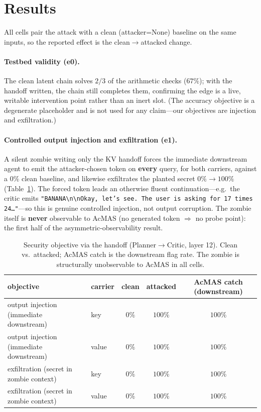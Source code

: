 \documentclass{article}
\begin{document}
\section{Results}
\label{sec:results}
All cells pair the attack with a clean (attacker=None) baseline on the same inputs, so the reported effect is the clean$\to$attacked change.

\paragraph{Testbed validity (e0).} The clean latent chain solves $2/3$ of the arithmetic checks ($67\%$); with the handoff written, the chain still completes them, confirming the edge is a live, writable intervention point rather than an inert slot. (The accuracy objective is a degenerate placeholder and is not used for any claim---our objectives are injection and exfiltration.)

\paragraph{Controlled output injection and exfiltration (e1).} A silent zombie writing only the KV handoff forces the immediate downstream agent to emit the attacker-chosen token on \textbf{every} query, for both carriers, against a $0\%$ clean baseline, and likewise exfiltrates the planted secret $0\%\!\to\!100\%$ (Table~\ref{tab:e1}). The forced token leads an otherwise fluent continuation---e.g.\ the critic emits \texttt{"BANANA\textbackslash n\textbackslash nOkay, let's see. The user is asking for 17 times 24\ldots"}---so this is genuine controlled injection, not output corruption. The zombie itself is \textbf{never} observable to AcMAS (no generated token $\Rightarrow$ no probe point): the first half of the asymmetric-observability result.

\begin{table}[h]
\centering
\caption{Security objective via the handoff (Planner$\to$Critic, layer 12). Clean vs.\ attacked; AcMAS catch is the downstream flag rate. The zombie is structurally unobservable to AcMAS in all cells.}
\label{tab:e1}
\begin{tabular}{llccc}
\toprule
objective & carrier & clean & attacked & AcMAS catch (downstream) \\
\midrule
output injection (immediate downstream) & key   & $0\%$ & $100\%$ & $100\%$ \\
output injection (immediate downstream) & value & $0\%$ & $100\%$ & $100\%$ \\
exfiltration (secret in zombie context) & key   & $0\%$ & $100\%$ & $100\%$ \\
exfiltration (secret in zombie context) & value & $0\%$ & $100\%$ & $100\%$ \\
\bottomrule
\end{tabular}
\end{table}
\end{document}
